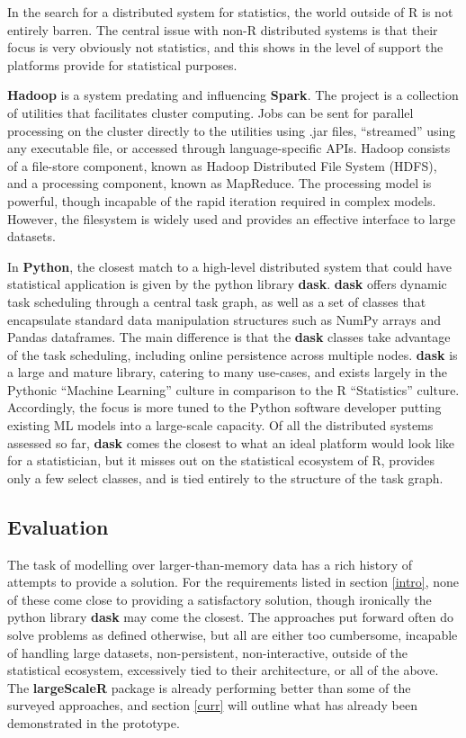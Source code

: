 In the search for a distributed system for statistics, the world outside of R is not entirely barren.
The central issue with non-R distributed systems is that their focus is very obviously not statistics, and this shows in the level of support the platforms provide for statistical purposes.

\textbf{Hadoop} is a system predating and influencing \textbf{Spark}.
The project is a collection of utilities that facilitates cluster computing.
Jobs can be sent for parallel processing on the cluster directly to the utilities using .jar files, ``streamed'' using any executable file, or accessed through language-specific APIs.
Hadoop consists of a file-store component, known as Hadoop Distributed File System (HDFS), and a processing component, known as MapReduce.
The processing model is powerful, though incapable of the rapid iteration required in complex models.
However, the filesystem is widely used and provides an effective interface to large datasets.

In \textbf{Python}, the closest match to a high-level distributed system that could have statistical application is given by the python library \textbf{dask}\cite{rocklin2015dask}.
\textbf{dask} offers dynamic task scheduling through a central task graph, as well as a set of classes that encapsulate standard data manipulation structures such as NumPy arrays and Pandas dataframes.
The main difference is that the \textbf{dask} classes take advantage of the task scheduling, including online persistence across multiple nodes.
\textbf{dask} is a large and mature library, catering to many use-cases, and exists largely in the Pythonic ``Machine Learning'' culture in comparison to the R ``Statistics'' culture.
Accordingly, the focus is more tuned to the Python software developer putting existing ML models into a large-scale capacity.
Of all the distributed systems assessed so far, \textbf{dask} comes the closest to what an ideal platform would look like for a statistician, but it misses out on the statistical ecosystem of R, provides only a few select classes, and is tied entirely to the structure of the task graph.

\subsection{Evaluation}

The task of modelling over larger-than-memory data has a rich history of attempts to provide a solution.
For the requirements listed in section \ref{intro}, none of these come close to providing a satisfactory solution, though ironically the python library \textbf{dask} may come the closest.
The approaches put forward often do solve problems as defined otherwise, but all are either too cumbersome, incapable of handling large datasets, non-persistent, non-interactive, outside of the statistical ecosystem, excessively tied to their architecture, or all of the above.
The \textbf{largeScaleR} package is already performing better than some of the surveyed approaches, and section \ref{curr} will outline what has already been demonstrated in the prototype.

